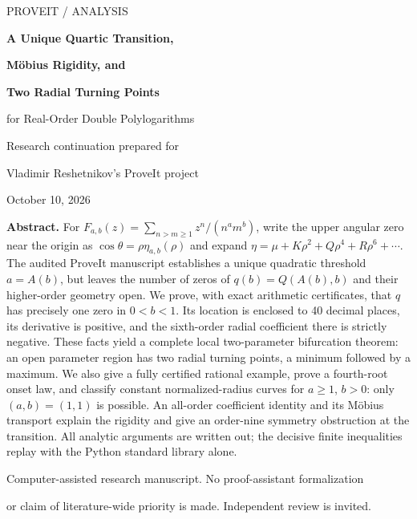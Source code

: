 \documentclass[11pt,a4paper]{article}
\theoremstyle{definition}\newtheorem{definition}[theorem]{Definition}
\theoremstyle{remark}\newtheorem{remark}[theorem]{Remark}
\numberwithin{equation}{section}
\begin{document}
\begin{titlepage}
\centering
\vspace*{14mm}
{\large PROVEIT \quad / \quad ANALYSIS\par}
\vspace{13mm}
{\huge\bfseries A Unique Quartic Transition,\par}
\vspace{3mm}
{\huge\bfseries M\"obius Rigidity, and\par}
\vspace{3mm}
{\huge\bfseries Two Radial Turning Points\par}
\vspace{8mm}
{\Large for Real-Order Double Polylogarithms\par}
\vspace{14mm}
{\large Research continuation prepared for\par}
\vspace{2mm}
{\Large Vladimir Reshetnikov's ProveIt project\par}
\vspace{6mm}
{October 10, 2026\par}
\vfill
\begin{minipage}{0.91\textwidth}
\textbf{Abstract.}
For $F_{a,b}(z)=\sum_{n>m\ge1}z^n/(n^a m^b)$, write the upper angular
zero near the origin as $\cos\theta=\rho\eta_{a,b}(\rho)$ and expand
$\eta=\mu+K\rho^2+Q\rho^4+R\rho^6+\cdots$.
The audited ProveIt manuscript establishes a unique quadratic threshold
$a=A(b)$, but leaves the number of zeros of $q(b)=Q(A(b),b)$ and their
higher-order geometry open. We prove, with exact arithmetic certificates,
that $q$ has precisely one zero in $0<b<1$. Its location is enclosed to
40 decimal places, its derivative is positive, and the sixth-order radial
coefficient there is strictly negative. These facts yield a complete local
two-parameter bifurcation theorem: an open parameter region has two radial
turning points, a minimum followed by a maximum. We also give a fully
certified rational example, prove a fourth-root onset law, and classify
constant normalized-radius curves for $a\ge1$, $b>0$: only $(a,b)=(1,1)$
is possible. An all-order coefficient identity and its M\"obius transport
explain the rigidity and give an order-nine symmetry obstruction at the
transition. All analytic arguments are written out; the decisive finite
inequalities replay with the Python standard library alone.
\end{minipage}
\vfill
{\small Computer-assisted research manuscript. No proof-assistant formalization\par
or claim of literature-wide priority is made. Independent review is invited.\par}
\end{titlepage}
\tableofcontents
\newpage
\end{document}
